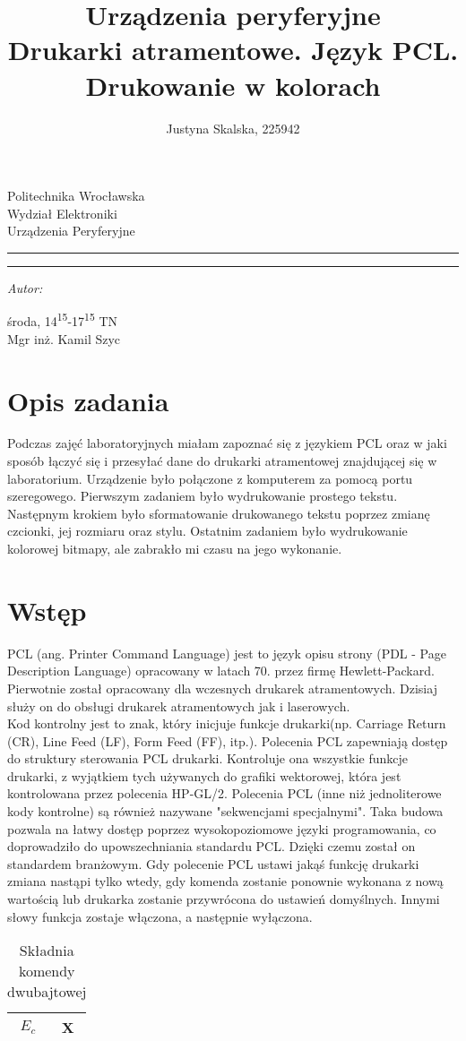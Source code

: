 \documentclass{article}
\author{Justyna Skalska, 225942}
\title{\textbf{Urządzenia peryferyjne}\\
\normalsize{Drukarki atramentowe. Język PCL. Drukowanie w kolorach}}
\makeatletter
\newcommand{\linia}{\rule{\linewidth}{0.4mm}}
\renewcommand{\maketitle}{\begin{titlepage}
    \vspace*{1cm}
    \begin{center}\small
    Politechnika Wrocławska\\
    Wydział Elektroniki\\
    Urządzenia Peryferyjne
    \end{center}
    \vspace{3cm}
    \noindent\linia
    \begin{center}
      \LARGE \textsc{\@title}
         \end{center}
     \linia
    \vspace{0.5cm}
    \begin{flushright}
    \begin{minipage}{7cm}
    \textit{\small Autor:}\\
    \normalsize \textsc{\@author} \par
    \end{minipage}
    \vspace{5cm}

     {\small środa, 14\textsuperscript{15}-17\textsuperscript{15} TN}\\
        Mgr inż. Kamil Szyc
     \end{flushright}
    \vspace*{\stretch{6}}
    \begin{center}
    \@date
    \end{center}
  \end{titlepage}
}
\makeatother
\begin{document}
\maketitle
\tableofcontents

\newpage

\section{Opis zadania}
Podczas zajęć laboratoryjnych miałam zapoznać się z językiem PCL oraz w jaki sposób łączyć się i przesyłać dane do drukarki atramentowej znajdującej się w laboratorium. Urządzenie było połączone z komputerem za pomocą portu szeregowego. Pierwszym zadaniem było wydrukowanie prostego tekstu. Następnym krokiem było sformatowanie drukowanego tekstu poprzez zmianę czcionki, jej rozmiaru oraz stylu. Ostatnim zadaniem było wydrukowanie kolorowej bitmapy, ale zabrakło mi czasu na jego wykonanie.

\section{Wstęp} 
PCL (ang. Printer Command Language) jest to język opisu strony (PDL - Page Description Language) opracowany w latach 70. przez firmę Hewlett-Packard. Pierwotnie został opracowany dla wczesnych drukarek atramentowych. Dzisiaj służy on do obsługi drukarek atramentowych  jak i laserowych.\citep{wiki}\bigskip\\
Kod kontrolny jest to znak, który inicjuje funkcje drukarki(np. Carriage Return (CR), Line Feed (LF), Form Feed (FF), itp.). Polecenia PCL zapewniają dostęp do struktury sterowania PCL drukarki. Kontroluje ona wszystkie funkcje drukarki, z wyjątkiem tych używanych do grafiki wektorowej, która jest kontrolowana przez polecenia HP-GL/2. Polecenia PCL (inne niż jednoliterowe kody kontrolne) są również nazywane "sekwencjami specjalnymi". Taka budowa pozwala na łatwy dostęp poprzez wysokopoziomowe języki programowania, co doprowadziło do upowszechniania standardu PCL. Dzięki czemu został on standardem branżowym. Gdy polecenie PCL ustawi jakąś funkcję drukarki zmiana nastąpi tylko wtedy, gdy komenda zostanie ponownie wykonana z nową wartością lub drukarka zostanie przywrócona do ustawień domyślnych. Innymi słowy funkcja zostaje włączona, a następnie wyłączona.

\begin{table}[H]
    \centering
    \caption{Składnia komendy dwubajtowej}
    \begin{tabular}{|c|c|}
        \hline
        $E_{c}$ & X \\
       \hline
    \end{tabular}
    \label{tab:two_byte_command}
\end{table}
\end{document}
